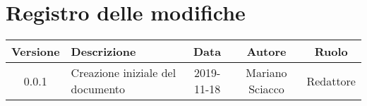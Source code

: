 \section*{Registro delle modifiche}

\begin{center}
	\begin{longtable}{|c|p{5cm}|c|c|c|}
	\hline
	\rowcolor{lighter-grayer}
	\textbf{Versione} & \textbf{Descrizione} & \textbf{Data} & \textbf{Autore} & \textbf{Ruolo} \\
	\hline
	\endfirsthead


	\hline
	0.0.1 & Creazione iniziale del documento & 2019-11-18 & Mariano Sciacco & Redattore \\
	\hline

	\end{longtable}
\end{center}